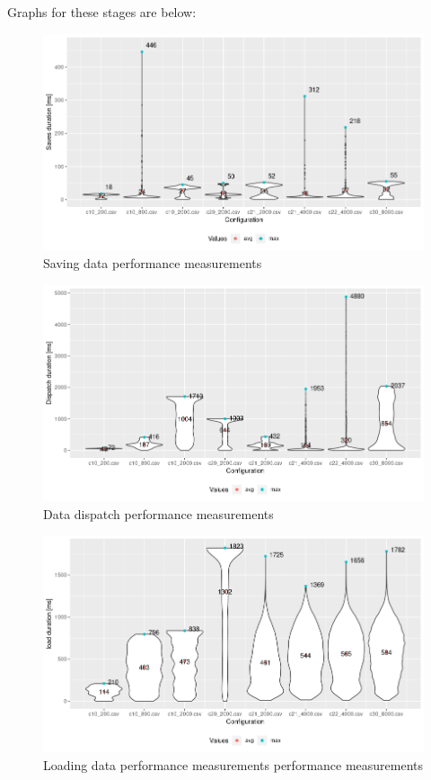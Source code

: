Graphs for these stages are below:
\begin{figure}[H]
    \includegraphics[width=\textwidth]{obrazky-figures/save.png}
    \caption{Saving data performance measurements}
    \label{img:measure_save}
\end{figure}
\begin{figure}[H]
    \includegraphics[width=\textwidth]{obrazky-figures/dispatch.png}
    \caption{Data dispatch performance measurements}
    \label{img:measure_dispatch}
\end{figure}

\begin{figure}[H]
    \includegraphics[width=\textwidth]{obrazky-figures/load.png}
    \caption{Loading data performance measurements performance measurements}
    \label{img:measure_load}
\end{figure}


